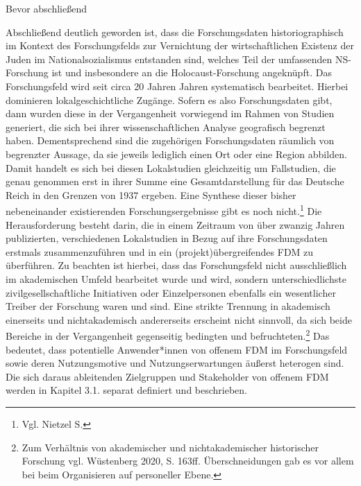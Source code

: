 Bevor abschließend 

Abschließend deutlich geworden ist, dass die Forschungsdaten historiographisch im  Kontext des Forschungsfelds zur Vernichtung der wirtschaftlichen Existenz der Juden im Nationalsozialismus entstanden sind, welches Teil der umfassenden NS-Forschung ist und insbesondere an die Holocaust-Forschung angeknüpft. Das Forschungsfeld wird seit circa 20 Jahren Jahren systematisch bearbeitet. Hierbei dominieren lokalgeschichtliche Zugänge. Sofern es also Forschungsdaten gibt, dann wurden diese in der Vergangenheit vorwiegend im Rahmen von Studien generiert, die sich bei ihrer wissenschaftlichen Analyse geografisch begrenzt haben. Dementsprechend sind die zugehörigen Forschungsdaten räumlich von begrenzter Aussage, da sie jeweils lediglich einen Ort oder eine Region abbilden. Damit handelt es sich bei diesen Lokalstudien gleichzeitig um Fallstudien, die genau genommen erst in ihrer Summe eine Gesamtdarstellung für das Deutsche Reich in den Grenzen von 1937 ergeben. Eine Synthese dieser bisher nebeneinander existierenden Forschungsergebnisse gibt es noch nicht.\footnote{Vgl. Nietzel S.} Die Herausforderung besteht darin, die in einem Zeitraum von über zwanzig Jahren publizierten, verschiedenen Lokalstudien in Bezug auf ihre Forschungsdaten erstmals zusammenzuführen und in ein (projekt)übergreifendes FDM zu überführen. Zu beachten ist hierbei, dass das Forschungsfeld nicht ausschließlich im akademischen Umfeld bearbeitet wurde und wird, sondern unterschiedlichste zivilgesellschaftliche Initiativen oder Einzelpersonen ebenfalls ein wesentlicher Treiber der Forschung waren und sind. Eine strikte Trennung in akademisch einerseits und nichtakademisch andererseits erscheint nicht sinnvoll, da sich beide Bereiche in der Vergangenheit gegenseitig bedingten und befruchteten.\footnote{Zum Verhältnis von akademischer und nichtakademischer historischer Forschung vgl. Wüstenberg 2020, S. 163ff. Überschneidungen gab es vor allem bei beim Organisieren auf personeller Ebene.} Das bedeutet, dass potentielle Anwender*innen von offenem FDM im Forschungsfeld sowie deren Nutzungsmotive und Nutzungserwartungen äußerst heterogen sind. Die sich daraus ableitenden Zielgruppen und Stakeholder von offenem FDM werden in Kapitel 3.1. separat definiert und beschrieben.

